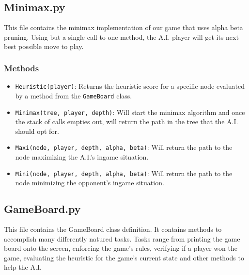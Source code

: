\documentclass[10pt]{article}
\begin{document}
\subsection{Minimax.py}
This file contains the minimax implementation of our game that uses alpha beta pruning. Using but a single call to one method, the A.I. player will get its next best possible move to play.

\subsubsection*{Methods}
\begin{itemize}
    \item \texttt{Heuristic(player)}: Returns the heuristic score for a specific node evaluated by a method from the \texttt{GameBoard} class.
    \item \texttt{Minimax(tree, player, depth)}: Will start the minimax algorithm and once the stack of calls empties out, will return the path in the tree that the A.I. should opt for.
    \item \texttt{Maxi(node, player, depth, alpha, beta)}: Will return the path to the node maximizing the A.I.’s ingame situation.
    \item \texttt{Mini(node, player, depth, alpha, beta)}: Will return the path to the node minimizing the opponent’s ingame situation.
\end{itemize}

\subsection{GameBoard.py}
This file contains the GameBoard class definition. It contains methods to accomplish many differently natured tasks. Tasks range from printing the game board onto the screen, enforcing the game’s rules, verifying if a player won the game, evaluating the heuristic for the game’s current state and other methods to help the A.I.
\end{document}
